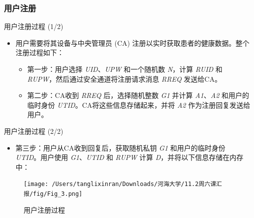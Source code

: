 \documentclass{beamer}
\begin{document}
\subsubsection{用户注册}
\begin{frame}{用户注册过程 (1/2)}
    \begin{itemize}
        \item 用户需要将其设备与中央管理员 (CA) 注册以实时获取患者的健康数据。整个注册过程如下：
        \begin{itemize}
            \item 第一步：用户选择 \textit{UID}、\textit{UPW} 和一个随机数 \textit{N}，计算 \textit{RUID} 和 \textit{RUPW}，然后通过安全通道将注册请求消息 \textit{RREQ} 发送给CA。
            \item 第二步：CA收到 \textit{RREQ} 后，选择随机整数 \textit{G1} 并计算 \textit{A1}、\textit{A2} 和用户的临时身份 \textit{UTID}。CA将这些信息存储起来，并将 \textit{A2} 作为注册回复发送给用户。
        \end{itemize}
    \end{itemize}
\end{frame}

\begin{frame}{用户注册过程 (2/2)}
    \begin{itemize}
        \item 第三步：用户从CA收到回复后，获取随机私钥 \textit{G1} 和用户的临时身份 \textit{UTID}。用户使用 \textit{G1}、\textit{UTID} 和 \textit{RUPW} 计算 \textit{D}，并将以下信息存储在内存中：%
    \end{itemize}

    \begin{figure}
        \centering
        \texttt{[image: /Users/tanglixinran/Downloads/河海大学/11.2周六课汇报/fig/Fig\_3.png]} %
        \caption{用户注册过程}
    \end{figure}
\end{frame}
\end{document}
